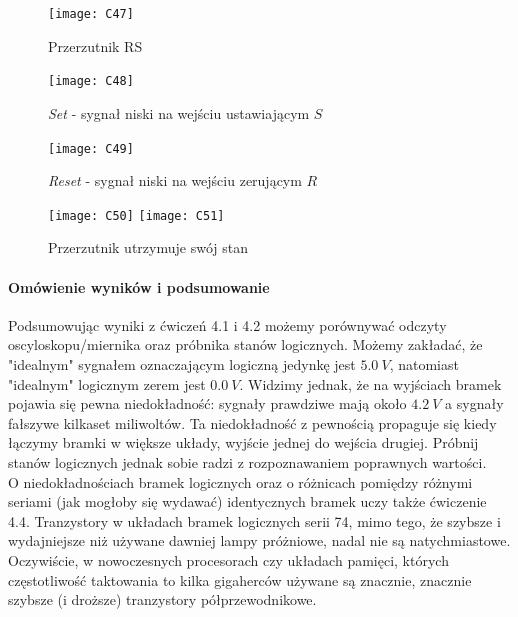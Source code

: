 \documentclass[14pt, table]{extarticle}
\begin{document}
\begin{figure}[H]
\texttt{[image: C47]}
\centering
\captionsetup{labelformat=empty}
\caption{Przerzutnik RS}
\end{figure}

\begin{figure}[H]
\texttt{[image: C48]}
\centering
\captionsetup{labelformat=empty}
\caption{\textit{Set} - sygnał niski na wejściu ustawiającym $S$}
\end{figure}

\begin{figure}[H]
\texttt{[image: C49]}
\centering
\captionsetup{labelformat=empty}
\caption{\textit{Reset} - sygnał niski na wejściu zerującym $R$}
\end{figure}

\begin{figure}[H]
\texttt{[image: C50]}
\texttt{[image: C51]}
\centering
\captionsetup{labelformat=empty}
\caption{Przerzutnik utrzymuje swój stan}
\end{figure}

\newpage
\paragraph{Omówienie wyników i podsumowanie \\}
Podsumowując wyniki z ćwiczeń 4.1 i 4.2 możemy porównywać odczyty oscyloskopu/miernika oraz próbnika stanów logicznych. Możemy zakładać, że "idealnym" sygnałem oznaczającym logiczną jedynkę jest $5.0 \ V$, natomiast "idealnym" logicznym zerem jest $0.0 \ V$. Widzimy jednak, że na wyjściach bramek pojawia się pewna niedokładność: sygnały prawdziwe mają około $4.2 \ V$ a sygnały fałszywe kilkaset miliwoltów. Ta niedokładność z pewnością propaguje się kiedy łączymy bramki w większe układy, wyjście jednej do wejścia drugiej. Próbnij stanów logicznych jednak sobie radzi z rozpoznawaniem poprawnych wartości. \\

O niedokładnościach bramek logicznych oraz o różnicach pomiędzy różnymi seriami (jak mogłoby się wydawać) identycznych bramek uczy także ćwiczenie 4.4. Tranzystory w układach bramek logicznych serii 74, mimo tego, że szybsze i wydajniejsze niż używane dawniej lampy próżniowe, nadal nie są natychmiastowe. Oczywiście, w nowoczesnych procesorach czy układach pamięci, których częstotliwość taktowania to kilka gigaherców używane są znacznie, znacznie szybsze (i droższe) tranzystory półprzewodnikowe. \\
\end{document}
